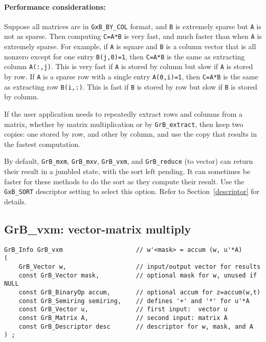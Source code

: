 \documentclass[12pt]{article}
\begin{document}
\paragraph{\bf Performance considerations:}
Suppose all matrices are in \verb'GxB_BY_COL' format, and \verb'B' is extremely
sparse but \verb'A' is not as sparse.  Then computing \verb'C=A*B' is very
fast, and much faster than when \verb'A' is extremely sparse.  For example, if
\verb'A' is square and \verb'B' is a column vector that is all nonzero except
for one entry \verb'B(j,0)=1', then \verb'C=A*B' is the same as extracting
column \verb'A(:,j)'.  This is very fast if \verb'A' is stored by column but
slow if \verb'A' is stored by row.  If \verb'A' is a sparse row with a single
entry \verb'A(0,i)=1', then \verb'C=A*B' is the same as extracting row
\verb'B(i,:)'.  This is fast if \verb'B' is stored by row but slow if \verb'B'
is stored by column.

If the user application needs to repeatedly extract rows and columns from a
matrix, whether by matrix multiplication or by \verb'GrB_extract', then keep
two copies: one stored by row, and other by column, and use the copy that
results in the fastest computation.

By default, \verb'GrB_mxm', \verb'GrB_mxv', \verb'GrB_vxm', and
\verb'GrB_reduce' (to vector) can return their result in a jumbled state, with
the sort left pending.  It can sometimes be faster for these methods to do the
sort as they compute their result.  Use the \verb'GxB_SORT' descriptor setting
to select this option.  Refer to Section~\ref{descriptor} for details.

\newpage
\subsection{{\sf GrB\_vxm:} vector-matrix multiply} %
\label{vxm}

\begin{mdframed}[userdefinedwidth=6in]
{\footnotesize
\begin{verbatim}
GrB_Info GrB_vxm                    // w'<mask> = accum (w, u'*A)
(
    GrB_Vector w,                   // input/output vector for results
    const GrB_Vector mask,          // optional mask for w, unused if NULL
    const GrB_BinaryOp accum,       // optional accum for z=accum(w,t)
    const GrB_Semiring semiring,    // defines '+' and '*' for u'*A
    const GrB_Vector u,             // first input:  vector u
    const GrB_Matrix A,             // second input: matrix A
    const GrB_Descriptor desc       // descriptor for w, mask, and A
) ;
\end{verbatim} } \end{mdframed}
\end{document}
